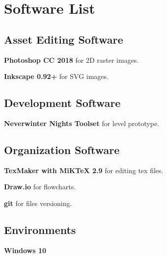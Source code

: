 \section{Software List}

\subsection{Asset Editing Software}
\textbf{Photoshop CC 2018} for 2D raster images.

\textbf{Inkscape 0.92+} for SVG images.

\subsection{Development Software}
\textbf{Neverwinter Nights Toolset} for level prototype.

\subsection{Organization Software}
\textbf{TexMaker with MiKTeX 2.9} for editing tex files.

\textbf{Draw.io} for flowcharts.

\textbf{git} for files versioning.

\subsection{Environments}
\textbf{Windows 10}
